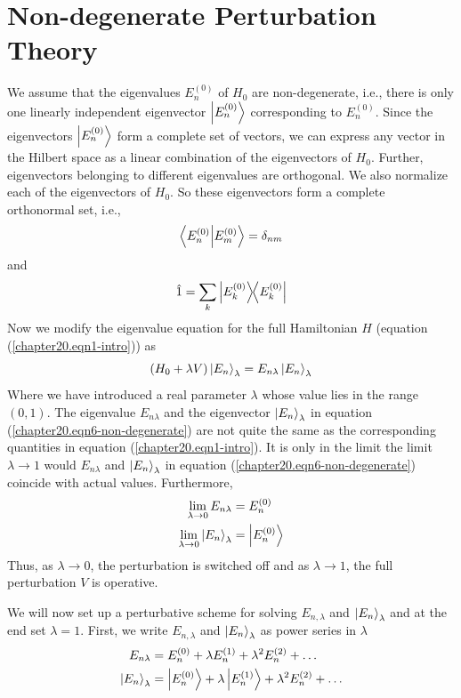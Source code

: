 \section{Non-degenerate Perturbation Theory}
We assume that the eigenvalues $E_n^{(0)}$ of $H_0$ are non-degenerate, i.e., there is only one linearly independent eigenvector $\ket{E_n^{(0)}}$ corresponding to $E_n^{(0)}$. Since the eigenvectors $\ket{E_n^{(0)}}$ form a complete set of vectors, we can express any vector in the Hilbert space as a linear combination of the eigenvectors of $H_0$. Further, eigenvectors belonging to different eigenvalues are orthogonal. We also normalize each of the eigenvectors of $H_0$. So these eigenvectors form a complete orthonormal set, i.e.,
\begin{equation}
	\braket{E_n^{(0)}}{E_m^{(0)}} = \delta_{n m}
	\label{chapter20.eqn4-non-degenerate}
\end{equation}
and
\begin{equation}
	\hat{1} = \sum_{k} \ketbra{E_k^{(0)}}{E_k^{(0)}}
	\label{chapter20.eqn5-non-degenerate}
\end{equation}
Now we modify the eigenvalue equation for the full Hamiltonian $H$ (equation (\ref{chapter20.eqn1-intro})) as
\begin{equation}
	(H_0 + \lambda V) \ket{E_n}_\lambda = E_{n\lambda} \ket{E_n}_\lambda
	\label{chapter20.eqn6-non-degenerate}
\end{equation}
Where we have introduced a real parameter $\lambda$ whose value lies in the range $(0,1)$. The eigenvalue $E_{n \lambda}$ and the eigenvector $\ket{E_n}_\lambda$  in equation (\ref{chapter20.eqn6-non-degenerate}) are not quite the same as the corresponding quantities in equation (\ref{chapter20.eqn1-intro}). It is only in the limit the limit $\lambda\rightarrow 1$ would $E_{n\lambda}$ and  $\ket{E_n}_\lambda$ in equation (\ref{chapter20.eqn6-non-degenerate}) coincide with actual values. Furthermore,
\begin{align}
	\lim\limits_{\lambda \rightarrow 0} E_{n \lambda} &= E_n^{(0)} \\
	\lim\limits_{\lambda \rightarrow 0} \ket{E_n}_\lambda &= \ket{E_{n}^{(0)}}
\end{align}
Thus, as $\lambda \rightarrow 0$, the perturbation is switched off and as $\lambda \rightarrow 1$, the full perturbation $V$ is operative.

We will now set up a perturbative scheme for solving $E_{n,\lambda}$ and $\ket{E_n}_\lambda$ and at the end set $\lambda = 1$. First, we write $E_{n,\lambda}$ and $\ket{E_n}_\lambda$ as power series in $\lambda$
\begin{align}
\label{chapter20.eqn7-non-degenerate}
E_{n\lambda} &= E_n^{(0)} + \lambda E_n^{(1)} + \lambda^2 E_n^{(2)} + \ldots \\
\label{chapter20.eqn8-non-degenerate}
\ket{E_n}_\lambda &= \ket{E_n^{(0)}} + \lambda \ket{E_n^{(1)}} + \lambda^2 E_n^{(2)} + \ldots
\end{align}

